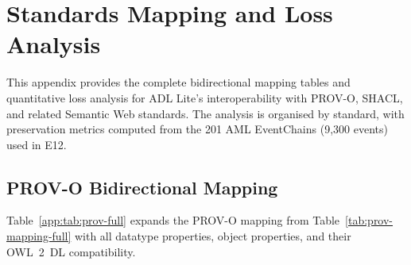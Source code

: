\section{Standards Mapping and Loss Analysis}\label{app:loss-analysis}

This appendix provides the complete bidirectional mapping tables and quantitative loss analysis for ADL Lite's interoperability with PROV-O, SHACL, and related Semantic Web standards. The analysis is organised by standard, with preservation metrics computed from the 201 AML EventChains (9,300 events) used in E12.

\subsection{PROV-O Bidirectional Mapping}

Table~\ref{app:tab:prov-full} expands the PROV-O mapping from Table~\ref{tab:prov-mapping-full} with all datatype properties, object properties, and their OWL~2~DL compatibility.

